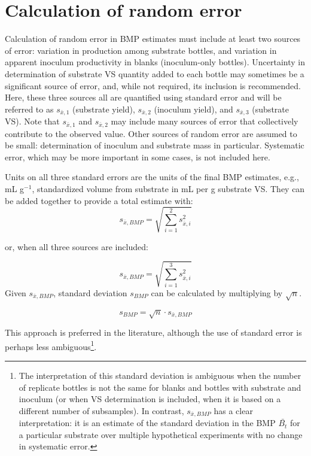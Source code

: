 \documentclass[]{article}
\begin{document}
\section{Calculation of random error}
Calculation of random error in BMP estimates must include at least two sources of error: variation in  production among substrate bottles, and variation in apparent inoculum  productivity in blanks (inoculum-only bottles).
Uncertainty in determination of substrate VS quantity added to each bottle may sometimes be a significant source of error, and, while not required, its inclusion is recommended. 
Here, these three sources all are quantified using standard error and will be referred to as $s_{\bar{x},1}$ (substrate yield), $s_{\bar{x},2}$ (inoculum yield), and $s_{\bar{x},3}$ (substrate VS). 
Note that $s_{\bar{x},1}$ and $s_{\bar{x},2}$ may include many sources of error that collectively contribute to the observed value. 
Other sources of random error are assumed to be small: determination of inoculum and substrate mass in particular. 
Systematic error, which may be more important in some cases, is not included here. 

Units on all three standard errors are the units of the final BMP estimates, e.g., mL g$^{-1}$, standardized  volume from substrate in mL per g substrate VS. 
They can be added together to provide a total estimate with:
\begin{equation}
  \label{eq:se_sum}
  s_{\bar{x},BMP} = \sqrt{\sum_{i=1} ^2 s_{\bar{x},i}^2}
\end{equation}

or, when all three sources are included:

\begin{equation}
  \label{eq:se_sum_3}
  s_{\bar{x},BMP} = \sqrt{\sum_{i=1} ^3 s_{\bar{x},i}^2}
\end{equation}
Given $s_{\bar{x},BMP}$, standard deviation $s_{BMP}$ can be calculated by multiplying by $\sqrt{n}$.

\begin{equation}
  \label{eq:sd}
  s_{BMP} = \sqrt{n} \cdot s_{\bar{x},BMP}
\end{equation}

This approach is preferred in the literature, although the use of standard error is perhaps less ambiguous\footnote{The interpretation of this standard deviation is ambiguous when the number of replicate bottles is not the same for blanks and bottles with substrate and inoculum (or when VS determination is included, when it is based on a different number of subsamples). 
In contrast, $s_{\bar{x},BMP}$ has a clear interpretation: it is an estimate of the standard deviation in the BMP $\bar{B_t}$ for a particular substrate over multiple hypothetical experiments with no change in systematic error.}. 
\end{document}
